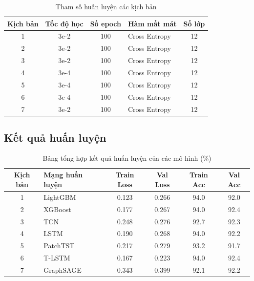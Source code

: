 \documentclass[10pt,twoside]{article}
\begin{document}
\begin{table}[!htbp] 
\centering 
\caption{Tham số huấn luyện các kịch bản} 
\label{tab:hyperparameter} 
\begin{tabular}{c c c l c} 
\hline 
\textbf{Kịch bản} & \textbf{Tốc độ học} & \textbf{Số epoch} & \textbf{Hàm mất mát} & \textbf{Số lớp} \\ 
\hline 
1 & 3e-2 & 100 & Cross Entropy & 12 \\ 
2 & 3e-2 & 100 & Cross Entropy & 12 \\ 
3 & 3e-2 & 100 & Cross Entropy & 12 \\ 
4 & 3e-4 & 100 & Cross Entropy & 12 \\ 
5 & 3e-4 & 100 & Cross Entropy & 12 \\ 
6 & 3e-4 & 100 & Cross Entropy & 12 \\ 
7 & 3e-2 & 100 & Cross Entropy & 12 \\ 
\hline 
\end{tabular} 
\end{table}
\subsection{Kết quả huấn luyện}

\begin{table}[!htbp]
\centering
\caption{Bảng tổng hợp kết quả huấn luyện của các mô hình (\%)}
\label{tab:training_results}
\begin{tabular}{c l c c c c}
\hline
\textbf{Kịch bản} & \textbf{Mạng huấn luyện} & \textbf{Train Loss} & \textbf{Val Loss} & \textbf{Train Acc} & \textbf{Val Acc} \\
\hline
1 & LightGBM  & 0.123 & 0.266 & 94.0 & 92.0 \\
2 & XGBoost   & 0.177 & 0.267 & 94.0 & 92.4 \\
3 & TCN       & 0.248 & 0.276 & 92.7 & 92.3 \\
4 & LSTM      & 0.190 & 0.268 & 94.0 & 92.2 \\
5 & PatchTST  & 0.217 & 0.279 & 93.2 & 91.7 \\
6 & T-LSTM    & 0.167 & 0.223 & 94.0 & 92.4 \\
7 & GraphSAGE & 0.343 & 0.399 & 92.1 & 92.2 \\
\hline
\end{tabular}
\end{table}
\end{document}
